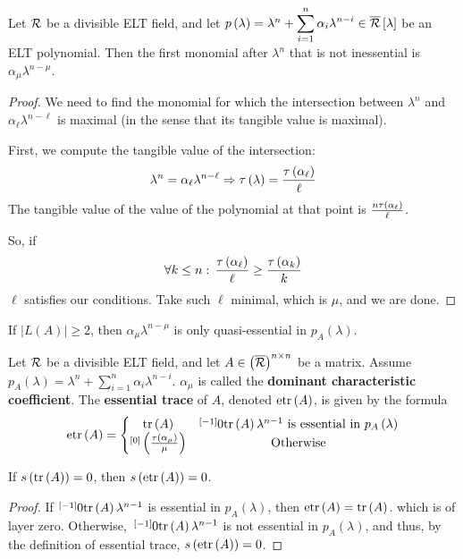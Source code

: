 \begin{lem}\label{lem:etr-justification}
Let $\R$ be a divisible ELT field, and let $p\left(\lambda\right)=\lambda^{n}+{\displaystyle \sum_{i=1}^{n}\alpha_{i}\lambda^{n-i}}\in\overline{\R}\left[\lambda\right]$ be an ELT polynomial. Then the first monomial after $\lambda^{n}$ that is not inessential is $\alpha_{\mu}\lambda^{n-\mu}$.
\end{lem}
\begin{proof}
We need to find the monomial for which the intersection between $\lambda^{n}$ and $\alpha_{\ell}\lambda^{n-\ell}$ is maximal (in the sense that its tangible value is maximal).

First, we compute the tangible value of the intersection:
$$\lambda^{n}=\alpha_{\ell}\lambda^{n-\ell}\Rightarrow\t\left(\lambda\right)=\frac{\t\left(\alpha_\ell\right)}{\ell}$$
The tangible value of the value of the polynomial at that point is $\frac{n\t\left(\alpha_\ell\right)}{\ell}$.

So, if
$$\forall k\leq n:\,\frac{\t\left(\alpha_\ell\right)}{\ell}\ge\frac{\t\left(\alpha_k\right)}{k}$$
$\ell$ satisfies our conditions. Take such $\ell$ minimal, which is $\mu$, and we are done.
\end{proof}

\begin{rem}
If $\left|L\left(A\right)\right|\ge2$, then $\alpha_{\mu}\lambda^{n-\mu}$ is only quasi-essential in $p_A\left(\lambda\right)$.
\end{rem}

\begin{defn}
Let $\R$ be a divisible ELT field, and let $A\in \left(\overline{\R}\right)^{n\times n}$ be a matrix. Assume $p_{A}\left(\lambda\right)=\lambda^{n}+{\displaystyle \sum_{i=1}^{n}\alpha_{i}\lambda^{n-i}}$. $\alpha_{\mu}$ is called the \textbf{dominant characteristic coefficient}. The \textbf{essential trace} of $A$, denoted $\etr\left(A\right)$, is given by the formula
$$\etr\left(A\right)=\left\{\begin{matrix}\tr\left(A\right)&\minus\tr\left(A\right)\lambda^{n-1}\textnormal{ is essential in }p_A\left(\lambda\right)\\\layer{\left(\frac{\t\left(\alpha_\mu\right)}{\mu}\right)}{0}&\textnormal{Otherwise}\end{matrix}\right.$$
\end{defn}

\begin{lem}\label{lem:tr-zero-implies-etr-zero}
If $s\left(\tr\left(A\right)\right)=0$, then $s\left(\etr\left(A\right)\right)=0$.
\end{lem}
\begin{proof}
If $\minus \tr\left(A\right)\lambda^{n-1}$ is essential in $p_A\left(\lambda\right)$, then $\etr\left(A\right)=\tr\left(A\right)$.
which is of layer zero. Otherwise,~$\minus \tr\left(A\right)\lambda^{n-1}$ is not essential in $p_A\left(\lambda\right)$, and thus, by the definition of essential trace, $s\left(\etr\left(A\right)\right)=0$.
\end{proof}

